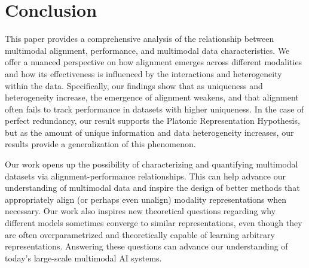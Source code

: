 \section{Conclusion}

This paper provides a comprehensive analysis of the relationship between multimodal alignment, performance, and multimodal data characteristics. We offer a nuanced perspective on how alignment emerges across different modalities and how its effectiveness is influenced by the interactions and heterogeneity within the data. Specifically, our findings show that as uniqueness and heterogeneity increase, the emergence of alignment weakens, and that alignment often fails to track performance in datasets with higher uniqueness. In the case of perfect redundancy, our result supports the Platonic Representation Hypothesis, but as the amount of unique information and data heterogeneity increases, our results provide a generalization of this phenomenon.

Our work opens up the possibility of characterizing and quantifying multimodal datasets via alignment-performance relationships. This can help advance our understanding of multimodal data and inspire the design of better methods that appropriately align (or perhaps even unalign) modality representations when necessary. Our work also inspires new theoretical questions regarding why different models sometimes converge to similar representations, even though they are often overparametrized and theoretically capable of learning arbitrary representations. Answering these questions can advance our understanding of today's large-scale multimodal AI systems. 